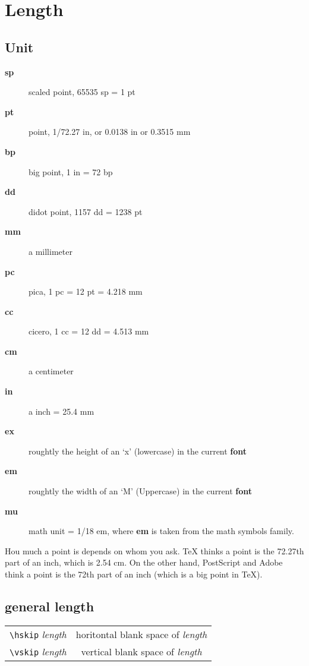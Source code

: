 \section{Length}

\subsection{Unit}
\begin{description}
    \item [\textbf{sp}] scaled point,  65535 sp = 1 pt
    \item [\textbf{pt}]	point, 1/72.27 in, or 0.0138 in or 0.3515 mm
    \item [\textbf{bp}] big point,  1 in = 72 bp
    \item [\textbf{dd}] didot point,  1157 dd = 1238 pt
    \item [\textbf{mm}] a millimeter
    \item [\textbf{pc}] pica,  1 pc = 12 pt = 4.218 mm
    \item [\textbf{cc}] cicero,  1 cc = 12 dd = 4.513 mm
    \item [\textbf{cm}] a centimeter
    \item [\textbf{in}] a inch = 25.4 mm
    \item [\textbf{ex}] roughtly the height of an `x' (lowercase) in the current \textbf{font}
    \item [\textbf{em}] roughtly the width of an `M' (Uppercase) in the current \textbf{font}
    \item [\textbf{mu}] math unit = 1/18 em, where \textbf{em} is taken from the math 
	symbols family.
\end{description}
Hou much a point is depends on whom you ask. \TeX{} thinks a point is the
72.27th part of an inch, which is 2.54 cm. On the other hand, PostScript
and Adobe think a point is the 72th part of an inch (which is a big point
in \TeX{}).

\subsection{general length}
\begin{table}[htb]
    \centering 
    \begin{tabular}{cc}
	\verb|\hskip| {\it length}  & horitontal blank space of {\it length}	\\
	\verb|\vskip| {\it length}  & vertical blank space of {\it length}	\\
    \end{tabular}
\end{table}

